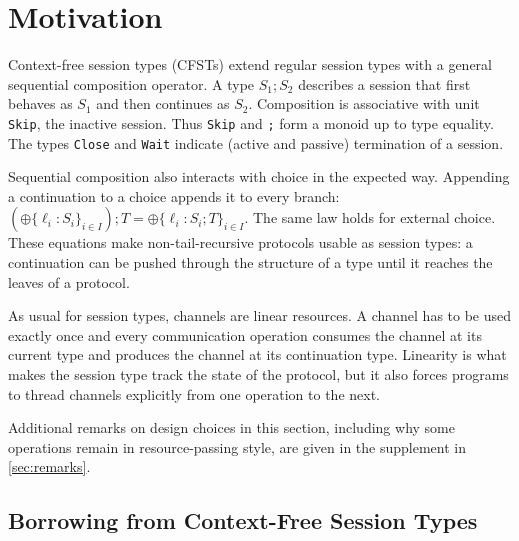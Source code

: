 
\section{Motivation}
\label{sec:motivation}

Context-free session types (CFSTs) extend regular session types with a
general sequential composition operator. A type $S_1;S_2$ describes a
session that first behaves as $S_1$ and then continues as $S_2$. 
Composition is associative with unit \lstinline{Skip}, the inactive session.
Thus
\lstinline{Skip} and \lstinline{;} form a monoid up to type
equality. The types \lstinline{Close} and \lstinline{Wait} indicate
(active and passive) termination of a session.

Sequential composition also interacts with choice in the expected way.
Appending a continuation to a choice appends it to every branch:
$(\oplus\{\ell_i:S_i\}_{i\in I});T =
\oplus\{\ell_i:S_i;T\}_{i\in I}$. The same law holds for external
choice. These equations make non-tail-recursive protocols
usable as session types: a continuation can be pushed through
the structure of a type until it reaches the leaves of a protocol.

As usual for session types, channels are linear resources. A channel
has to be used exactly once and every communication operation consumes
the channel at its current type and produces the channel at its
continuation type. Linearity is what makes the session type track the
state of the protocol, but it also forces programs to thread channels
explicitly from one operation to the next.

Additional remarks on design choices in this section, including why
some operations remain in resource-passing style, are given in the
supplement in \cref{sec:remarks}.

\subsection{Borrowing from Context-Free Session Types}
\label{sec:borr-from-cont}


